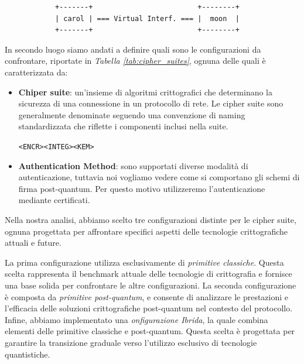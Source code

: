 \begin{center}
    \begin{verbatim}
            +-------+                         +--------+ 
            | carol | === Virtual Interf. === |  moon  |
            +-------+                         +--------+ 
    \end{verbatim}
\end{center}

\noindent
In secondo luogo siamo andati a definire quali sono le configurazioni da confrontare, riportate in 
\textit{Tabella \ref{tab:cipher_suites}}, ognuna delle quali è caratterizzata da:

\begin{itemize}
    \item \textbf{Chiper suite}: un'insieme di algoritmi crittografici che determinano la sicurezza di una connessione in un protocollo di rete.
    Le cipher suite sono generalmente denominate seguendo una convenzione di naming standardizzata che riflette i componenti inclusi nella suite.
    \begin{center}
        \texttt{<ENCR>\text{-}<INTEG>\text{-}<KEM>}
    \end{center}

    \item \textbf{Authentication Method}: sono supportati diverse modalità di autentica\-zione, tuttavia noi vogliamo vedere
    come si comportano gli schemi di firma post-quantum. Per questo motivo utilizzeremo l'autenticazione mediante 
    certificati. 
\end{itemize}

\noindent
Nella nostra analisi, abbiamo scelto tre configurazioni distinte per le cipher
suite, ognuna progettata per affrontare specifici aspetti delle tecnologie
critto\-grafiche attuali e future.

\noindent
La prima configurazione utilizza esclusivamente di \textit{primitive classiche}. 
Questa scelta rappresenta il benchmark attuale delle tecnologie di crittografia e fornisce una base
solida per confrontare le altre configurazioni. La seconda
configurazione è composta da \textit{primitive post-quantum}, e consente di
analizzare le prestazioni e l'efficacia delle soluzioni crittografiche
post-quantum nel contesto del protocollo. Infine, abbiamo implementato
una \textit{onfigurazione Ibrida}, la quale combina elementi delle primitive
classiche e post-quantum. Questa scelta è progettata per garantire la transizione 
graduale verso l'utilizzo esclusivo di tecnologie quantistiche.

